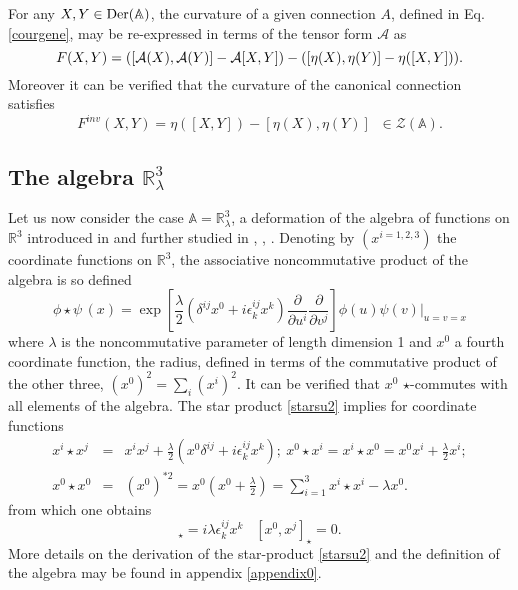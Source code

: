 \documentclass[a4paper,11pt]{article}
\numberwithin{equation}{section}
\newcommand\Rl{\mathbb{R}^3_\lambda}
\newcommand\caZ{{\mathcal Z}}
\newcommand\algebA{{\mathbb A}}
\newcommand\DER{{\text{\textup{Der}}}}
\newcommand\del{{\partial}}
\theoremstyle{nonumberplain}
\begin{document}
\noindent For any $X,Y\in\DER(\algebA)$, the curvature of a given connection $A$, defined in Eq. \eqref{courgene},  may be re-expressed in terms of the tensor form $\mathcal{A}$ as 
\begin{equation}
F{(X,Y)}=([{\cal{A}}(X),{\cal{A}}(Y)]-{\cal{A}}{[X,Y]})-([\eta(X),\eta(Y)]-\eta([X,Y]))\label{courburebis}.
\end{equation}
Moreover it can be  verified that the curvature of the canonical connection satisfies
 \begin{equation}
 F^{inv}{(X,Y)}=\eta([X,Y])-[\eta(X),\eta(Y)]\;\; \in\caZ(\algebA). \label{finv}
\end{equation}
\subsection{\texorpdfstring{The algebra $\mathbb{R}^3_\lambda$}{Diff calcul}}\label{subsection22}

Let us now consider the case $\algebA=\Rl$, a deformation of the algebra of functions on $\mathbb{R}^3$ introduced in \cite{Hammaa} and further studied in \cite{selene}, \cite{vit-wal-12}, \cite{duflo}.  
Denoting by $(x^{i=1,2,3})$ the coordinate functions on $\mathbb{R}^3$, the associative noncommutative product of the algebra is so defined 
\begin{equation}
\phi\star \psi \,(x)= \exp\left[\frac{\lambda}{2}\left(\delta^{ij} x^0+ i \epsilon^{ij}_k x^k \right)\frac{\del}{\del u^i}\frac{\del}{\del v^j}\right] \phi(u) \psi(v)|_{u=v=x} \label{starsu2}
\end{equation}
where $\lambda$ is the  noncommutative parameter of length dimension 1 and $x^0$ a fourth coordinate function, the radius,  defined in terms of the commutative product of  the other three, $(x^0)^2= \sum_i (x^i)^2$. It can be verified  that $x^0$ $\star$-commutes with all elements of the algebra. The star product \eqref{starsu2} implies for coordinate functions
 \begin{eqnarray}
x^i\star x^j&=& x^i x^j+ \frac{\lambda}{2} \left(x^0 \delta^{ij} + i \epsilon^{ij}_k x^k\right);\ x^0\star x^i = x^i\star x^0 = x^0 x^i + \frac{\lambda}{2} x^i;\\
x^0\star x^0&=&(x^0)^{*2}=x^0(x^0+\frac{\lambda}{2}) = \sum_{i=1}^3 x^i\star x^i- \lambda x^0 . \label{xx0*2}
 \end{eqnarray}
from which one obtains
\begin{equation}
 [x^i,x^j]_\star=i \lambda \epsilon^{ij}_k  x^k \;\;\; [x^0,x^j]_\star= 0\label{commsu2}.
\end{equation}
More details on the derivation of the star-product \eqref{starsu2} and the definition of the algebra may be found in appendix \ref{appendix0}. 
\end{document}
